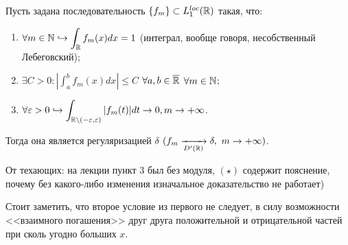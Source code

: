 \begin{theorem}
    Пусть задана последовательность $\{f_m\} \subset L_1^{loc}(\mathbb{R})$ такая, что:
    \begin{enumerate}
        \item $\displaystyle \forall m \in \mathbb{N} \hookrightarrow \int_{\mathbb{R}} f_m(x) dx = 1$ (интеграл, вообще говоря, несобственный Лебеговский);

        \item $\displaystyle \exists C > 0 : \left|\int_a^b f_m(x)dx\right| \leq C$ $\forall a, b \in \overline{\mathbb{R}}$ $\forall m \in \mathbb{N}$;

        \item $\displaystyle \forall \varepsilon > 0 \hookrightarrow \int_{\mathbb{R} \setminus (-\varepsilon, \varepsilon)} |f_m(t)|dt \rightarrow 0, m \rightarrow +\infty$.
    \end{enumerate}
    Тогда она является регуляризацией $\delta$ $(f_m \xrightarrow[D'(\mathbb{R})]{} \delta, \ m \rightarrow +\infty)$.
\end{theorem}

\begin{remark}
    От техающих: на лекции пункт $3$ был без модуля, $(\star)$ содержит пояснение, почему без какого-либо изменения изначальное доказательство не работает)
\end{remark}
\begin{note}
    Стоит заметить, что второе условие из первого не следует, в силу возможности <<взаимного погашения>> друг друга положительной и отрицательной частей при сколь угодно больших $x$.
\end{note}

